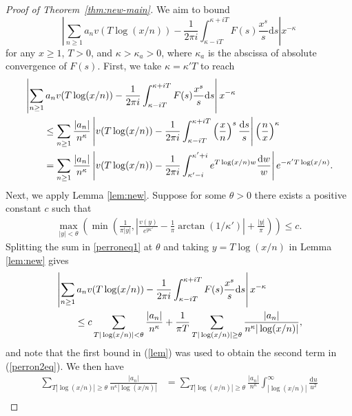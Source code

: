 \documentclass[reqno]{amsart}
\numberwithin{equation}{section}
\theoremstyle{remark}
\begin{document}
\begin{proof}[Proof of Theorem~\ref{thm:new-main}]
We aim to bound
\begin{equation*}
    \left| \sum_{n\geq 1} a_n v(T\log(x/n)) - \frac{1}{2\pi i} \int_{\kappa-iT}^{\kappa+iT} F(s) \frac{x^s}{s} \mathrm{d}s \right| x^{-\kappa}
\end{equation*}
for any $x\geq 1$, $T>0$, and $\kappa>\kappa_a>0$, where $\kappa_a$ is the abscissa of absolute convergence of $F(s)$. First, we take $\kappa = \kappa' T$ to reach
\begin{align}
    &\left| \sum_{n\geq 1} a_n v(T\log(x/n)) - \frac{1}{2\pi i} \int_{\kappa-iT}^{\kappa+iT} F(s) \frac{x^s}{s} \mathrm{d}s \right| x^{-\kappa}\notag\\
    &\qquad\leq \sum_{n\geq 1} \frac{|a_n|}{n^\kappa} \left| v(T\log(x/n)) - \frac{1}{2\pi i} \int_{\kappa-iT}^{\kappa+iT} \left(\frac{x}{n}\right)^{s}\frac{\mathrm{d}s}{s} \right| \left(\frac{n}{x}\right)^{\kappa}  \notag\\
    &\qquad= \sum_{n\geq 1} \frac{|a_n|}{n^\kappa} \left| v(T\log(x/n)) - \frac{1}{2\pi i} \int_{\kappa'-i}^{\kappa'+i} e^{T\log(x/n)w}\frac{\mathrm{d}w}{w}  \right| e^{-\kappa' T\log(x/n)}.\label{perroneq1}
\end{align}
Next, we apply Lemma \ref{lem:new}. Suppose for some $\theta> 0$ there exists a positive constant $c$ such that
\begin{align}
    \max_{|y|< \theta} \left( \min\left( \frac{1}{\pi |y|}, \left| \frac{v(y)}{e^{y\kappa'}} - \frac{1}{\pi} \arctan(1/\kappa') \right| + \frac{|y|}{\pi} \right) \right) \leq c  \label{c2}.
\end{align}
Splitting the sum in \eqref{perroneq1} at $\theta$ and taking $y=T\log(x/n)$ in Lemma \ref{lem:new} gives
\begin{align}
    &\left| \sum_{n\geq 1} a_n v(T\log(x/n)) - \frac{1}{2\pi i} \int_{\kappa-iT}^{\kappa+iT} F(s) \frac{x^s}{s} \mathrm{d}s \right| x^{-\kappa}\notag \\
    &\qquad\leq c\sum_{T|\log(x/n)| < \theta} \frac{|a_n|}{n^\kappa} + \frac{1}{\pi T} \sum_{T|\log(x/n)| \geq \theta} \frac{|a_n|}{n^\kappa |\log(x/n)|},\label{perron2eq}
\end{align}
and note that the first bound in (\ref{lem}) was used to obtain the second term in (\ref{perron2eq}). We then have
\begin{align*}
    \sum_{T|\log(x/n)| \geq \theta} \frac{|a_n|}{n^\kappa |\log(x/n)|} &= \sum_{T|\log(x/n)| \geq \theta} \frac{|a_n|}{n^\kappa} \int_{|\log(x/n)|}^\infty \frac{\mathrm{d}u}{u^2} \\

\end{align*}
\end{proof}
\end{document}
